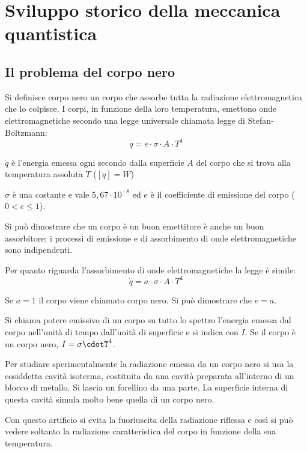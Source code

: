 \section{Sviluppo storico della meccanica quantistica}
    \subsection{Il problema del corpo nero}
        \par Si definisce corpo nero un corpo che assorbe tutta la radiazione elettromagnetica che lo colpisce. I corpi, in funzione della loro temperatura, emettono onde elettromagnetiche secondo una legge universale chiamata legge di Stefan-Boltzmann:
        \begin{equation}
            \dot{q} = e \cdot \sigma \cdot A \cdot T^4
        \end{equation}
        \par $\dot{q}$ è l'energia emessa ogni secondo dalla superficie $A$ del corpo che si trova alla temperatura assoluta $T$ ($[\dot{q}] = W$)
        \par $\sigma$ è una costante e vale $5,67\cdot10^{-8}$ ed $e$ è il coefficiente di emissione del corpo ($0<e\leq1$).
        \par Si può dimostrare che un corpo è un buon emettitore è anche un buon assorbitore; i processi di emissione e di assorbimento di onde elettromagnetiche sono indipendenti.
        \par Per quanto riguarda l'assorbimento di onde elettromagnetiche la legge è simile:
        \begin{equation}
            \dot{q}=a\cdot\sigma\cdot A\cdot T^4
        \end{equation}
        \par Se $a=1$ il corpo viene chiamato corpo nero. Si può dimostrare che $e=a$.
        \par Si chiama potere emissivo di un corpo su tutto lo spettro l'energia emessa dal corpo nell'unità di tempo dall'unità di superficie e si indica con $I$. Se il corpo è un corpo nero, $I=\sigma\cdotT^4$.
        \par Per studiare sperimentalmente la radiazione emessa da un corpo nero si usa la cosiddetta cavità isoterma, costituita da una cavità preparata all'interno di un blocco di metallo. Si lascia un forellino da una parte. La superficie interna di questa cavità simula molto bene quella di un corpo nero.
        \par Con questo artificio si evita la fuoriuscita della radiazione riflessa e così si può vedere soltanto la radiazione caratteristica del corpo in funzione della sua temperatura.
